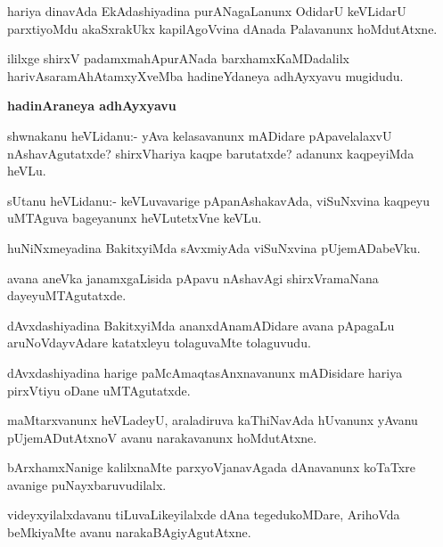 \begin{mng}
hariya dinavAda EkAdashiyadina purANagaLanunx OdidarU keVLidarU parxtiyoMdu akaSxrakUkx kapilAgoVvina dAnada Palavanunx hoMdutAtxne.
\end{mng}
ililxge shirxV padamxmahApurANada barxhamxKaMDadalilx harivAsaramAhAtamxyXveMba hadineYdaneya adhAyxyavu mugidudu.

\begin{center}
\textbf{\large hadinAraneya adhAyxyavu}
\end{center}

\begin{mng}
shwnakanu heVLidanu:- yAva kelasavanunx mADidare pApavelalaxvU nAshavAgutatxde? shirxVhariya kaqpe barutatxde? adanunx kaqpeyiMda heVLu.
\end{mng}

\begin{mng}
sUtanu heVLidanu:- keVLuvavarige pApanAshakavAda, viSuNxvina kaqpeyu uMTAguva bageyanunx heVLutetxVne keVLu.
\end{mng}

\begin{mng}
huNiNxmeyadina BakitxyiMda sAvxmiyAda viSuNxvina pUjemADabeVku.
\end{mng}

\begin{mng}
avana aneVka janamxgaLisida pApavu nAshavAgi shirxVramaNana dayeyuMTAgutatxde.
\end{mng}

\begin{mng}
dAvxdashiyadina BakitxyiMda ananxdAnamADidare avana pApagaLu aruNoVdayvAdare katatxleyu tolaguvaMte tolaguvudu.
\end{mng}

\begin{mng}
dAvxdashiyadina harige paMcAmaqtasAnxnavanunx mADisidare hariya pirxVtiyu oDane uMTAgutatxde.
\end{mng}

\begin{mng}
maMtarxvanunx heVLadeyU, araladiruva kaThiNavAda hUvanunx yAvanu pUjemADutAtxnoV avanu narakavanunx hoMdutAtxne.
\end{mng}

\begin{mng}
bArxhamxNanige kalilxnaMte parxyoVjanavAgada dAnavanunx koTaTxre avanige puNayxbaruvudilalx.
\end{mng}

\begin{mng}
videyxyilalxdavanu tiLuvaLikeyilalxde dAna tegedukoMDare, ArihoVda beMkiyaMte avanu narakaBAgiyAgutAtxne.
\end{mng}

